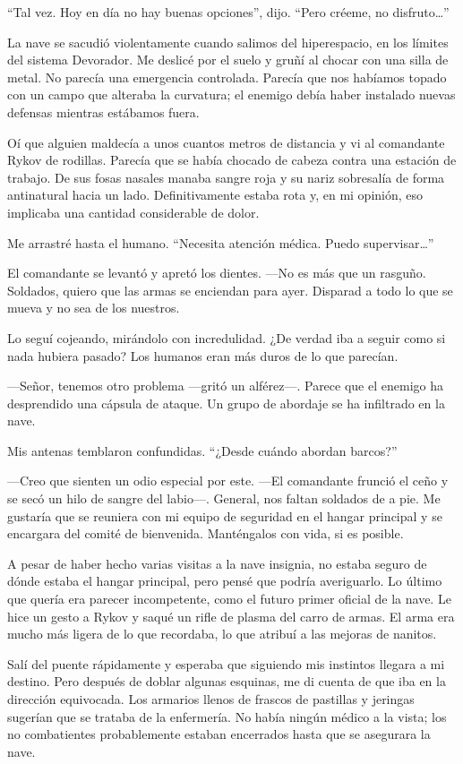 ``Tal vez. Hoy en día no hay buenas opciones'', dijo. ``Pero créeme, no disfruto…''

La nave se sacudió violentamente cuando salimos del hiperespacio, en los límites del sistema Devorador. Me deslicé por el suelo y gruñí al chocar con una silla de metal. No parecía una emergencia controlada. Parecía que nos habíamos topado con un campo que alteraba la curvatura; el enemigo debía haber instalado nuevas defensas mientras estábamos fuera.

Oí que alguien maldecía a unos cuantos metros de distancia y vi al comandante Rykov de rodillas. Parecía que se había chocado de cabeza contra una estación de trabajo. De sus fosas nasales manaba sangre roja y su nariz sobresalía de forma antinatural hacia un lado. Definitivamente estaba rota y, en mi opinión, eso implicaba una cantidad considerable de dolor.

Me arrastré hasta el humano. ``Necesita atención médica. Puedo supervisar…''

El comandante se levantó y apretó los dientes. —No es más que un rasguño. Soldados, quiero que las armas se enciendan para ayer. Disparad a todo lo que se mueva y no sea de los nuestros.

Lo seguí cojeando, mirándolo con incredulidad. ¿De verdad iba a seguir como si nada hubiera pasado? Los humanos eran más duros de lo que parecían.

—Señor, tenemos otro problema —gritó un alférez—. Parece que el enemigo ha desprendido una cápsula de ataque. Un grupo de abordaje se ha infiltrado en la nave.

Mis antenas temblaron confundidas. ``¿Desde cuándo abordan barcos?''

—Creo que sienten un odio especial por este. —El comandante frunció el ceño y se secó un hilo de sangre del labio—. General, nos faltan soldados de a pie. Me gustaría que se reuniera con mi equipo de seguridad en el hangar principal y se encargara del comité de bienvenida. Manténgalos con vida, si es posible.

A pesar de haber hecho varias visitas a la nave insignia, no estaba seguro de dónde estaba el hangar principal, pero pensé que podría averiguarlo. Lo último que quería era parecer incompetente, como el futuro primer oficial de la nave. Le hice un gesto a Rykov y saqué un rifle de plasma del carro de armas. El arma era mucho más ligera de lo que recordaba, lo que atribuí a las mejoras de nanitos.

Salí del puente rápidamente y esperaba que siguiendo mis instintos llegara a mi destino. Pero después de doblar algunas esquinas, me di cuenta de que iba en la dirección equivocada. Los armarios llenos de frascos de pastillas y jeringas sugerían que se trataba de la enfermería. No había ningún médico a la vista; los no combatientes probablemente estaban encerrados hasta que se asegurara la nave.

